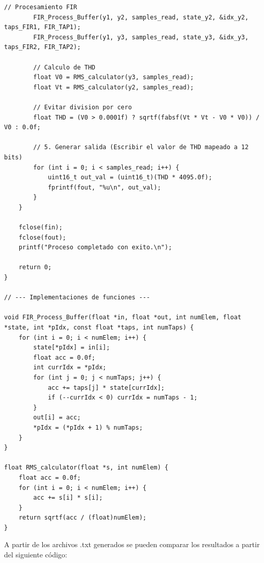 \begin{lstlisting}[style=mystyle, caption={Código empleado para generar salida de C.}, label={lst:filtro + ds}]
        // Procesamiento FIR
        FIR_Process_Buffer(y1, y2, samples_read, state_y2, &idx_y2, taps_FIR1, FIR_TAP1);
        FIR_Process_Buffer(y1, y3, samples_read, state_y3, &idx_y3, taps_FIR2, FIR_TAP2);

        // Calculo de THD
        float V0 = RMS_calculator(y3, samples_read);
        float Vt = RMS_calculator(y2, samples_read);
        
        // Evitar division por cero
        float THD = (V0 > 0.0001f) ? sqrtf(fabsf(Vt * Vt - V0 * V0)) / V0 : 0.0f;

        // 5. Generar salida (Escribir el valor de THD mapeado a 12 bits)
        for (int i = 0; i < samples_read; i++) {
            uint16_t out_val = (uint16_t)(THD * 4095.0f);
            fprintf(fout, "%u\n", out_val);
        }
    }

    fclose(fin);
    fclose(fout);
    printf("Proceso completado con exito.\n");

    return 0;
}

// --- Implementaciones de funciones ---

void FIR_Process_Buffer(float *in, float *out, int numElem, float *state, int *pIdx, const float *taps, int numTaps) {
    for (int i = 0; i < numElem; i++) {
        state[*pIdx] = in[i];
        float acc = 0.0f;
        int currIdx = *pIdx;
        for (int j = 0; j < numTaps; j++) {
            acc += taps[j] * state[currIdx];
            if (--currIdx < 0) currIdx = numTaps - 1;
        }
        out[i] = acc;
        *pIdx = (*pIdx + 1) % numTaps;
    }
}

float RMS_calculator(float *s, int numElem) {
    float acc = 0.0f;
    for (int i = 0; i < numElem; i++) {
        acc += s[i] * s[i];
    }
    return sqrtf(acc / (float)numElem);
}
\end{lstlisting}

\noindent A partir de los archivos .txt generados se pueden comparar los resultados a partir del siguiente código:



